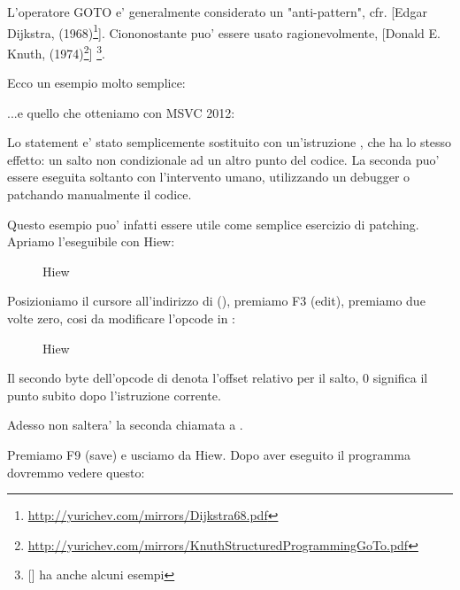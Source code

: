 
L'operatore GOTO e' generalmente considerato un "anti-pattern", cfr. [Edgar Dijkstra,  (1968)\footnote{\url{http://yurichev.com/mirrors/Dijkstra68.pdf}}].
Ciononostante puo' essere usato ragionevolmente, [Donald E. Knuth,  (1974)\footnote{\url{http://yurichev.com/mirrors/KnuthStructuredProgrammingGoTo.pdf}}]
\footnote{[\CNotes] ha anche alcuni esempi}.

Ecco un esempio molto semplice:



...e quello che otteniamo con MSVC 2012:



Lo statement  e' stato semplicemente sostituito con un'istruzione \JMP, che ha lo stesso effetto: un salto non condizionale
ad un altro punto del codice.
La seconda \printf puo' essere eseguita soltanto con l'intervento umano, utilizzando un debugger o patchando manualmente il codice.

\par

\clearpage

Questo esempio puo' infatti essere utile come semplice esercizio di patching. Apriamo l'eseguibile con Hiew:

\begin{figure}[H]
\centering
{}
\caption{Hiew}
\label{fig:goto_hiew1}
\end{figure}

\clearpage
Posizioniamo il cursore all'indirizzo di \JMP (), 
premiamo F3 (edit), premiamo due volte zero, cosi da modificare l'opcode in :

\begin{figure}[H]
\centering
{}
\caption{Hiew}
\label{fig:goto_hiew2}
\end{figure}

Il secondo byte dell'opcode di \JMP denota l'offset relativo per il salto, 0 significa il punto subito dopo l'istruzione corrente.

Adesso \JMP non saltera' la seconda chiamata a \printf.

Premiamo F9 (save) e usciamo da Hiew. Dopo aver eseguito il programma dovremmo vedere questo:

